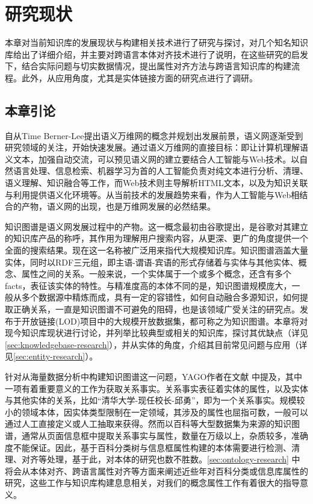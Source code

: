 \chapter{研究现状}
\label{cha:research}
本章对当前知识库的发展现状与构建相关技术进行了研究与探讨，对几个知名知识库给出了详细介绍，并主要对跨语言本体对齐技术进行了说明，在这些研究的启发下，结合实际问题与切实数据情况，提出属性对齐方法与跨语言知识库的构建流程。此外，从应用角度，尤其是实体链接方面的研究点进行了调研。

\section{本章引论}
自从Time Berner-Lee提出语义万维网的概念并规划出发展前景，语义网逐渐受到研究领域的关注，开始快速发展。通过语义万维网的直接目标：即让计算机理解语义文本，加强自动交流，可以预见语义网的建立要结合人工智能与Web技术。以自然语言处理、信息检索、机器学习为首的人工智能负责对纯文本进行分析、清理、语义理解、知识融合等工作，而Web技术则主导解析HTML文本，以及为知识关联与利用提供语义化环境等。从当前技术的发展趋势来看，作为人工智能与Web相结合的产物，语义网的出现，也是万维网发展的必然结果。

知识图谱是语义网发展过程中的产物。这一概念最初由谷歌提出，是谷歌对其建立的知识库产品的称呼，其作用为理解用户搜索内容，从更深、更广的角度提供一个全面的搜索结果。现在这一名称被广泛用来指代大规模知识库。知识图谱涵盖大量实体，同时以RDF三元组，即主语-谓语-宾语的形式存储着与实体与其他实体、概念、属性之间的关系。一般来说，一个实体属于一个或多个概念，还含有多个facts，表征该实体的特性。与精准度高的本体不同的是，知识图谱规模庞大，一般从多个数据源中精炼而成，具有一定的容错性，如何自动融合多源知识，如何提取正确关系，一直是知识图谱不可避免的阻碍，也是该领域广受关注的研究点。发布于开放链接(LOD)项目中的大规模开放数据集，都可称之为知识图谱。本章将对现今知识库现状进行讨论，并列举比较典型或相关的知识库，探讨其优缺点（详见\ref{sec:knowledgebase-research}），并从实体的角度，介绍其目前常见问题与应用（详见\ref{sec:entity-research}）。

针对从海量数据分析中构建知识图谱这一问题，YAGO作者在文献\cite{suchanek2014knowledge} 中提及，其中一项有着重要意义的工作为获取关系事实。关系事实表征着实体的属性，以及实体与其他实体的关系，比如“清华大学-现任校长-邱勇”，即为一个关系事实。规模较小的领域本体，因实体类型限制在一定领域，其涉及的属性也屈指可数，一般可以通过人工直接定义\cite{boyce2007developing}或人工抽取\cite{王巍巍2016双语影视知识图谱的构建研究}来获得。然而以百科等大型数据集为来源的知识图谱，通常从页面信息框中提取关系事实与属性，数量在万级以上，杂质较多，准确度不能保证。因此，基于百科分类树与信息框属性构建的本体需要进行检测、清理、对齐等处理，基于此，对本体的研究也数不胜数。\ref{sec:ontology-research} 中将会从本体对齐、跨语言属性对齐等方面来阐述近些年对百科分类或信息库属性的研究，这些工作与知识库构建息息相关，对我们的概念属性工作有着很大的指导意义。

